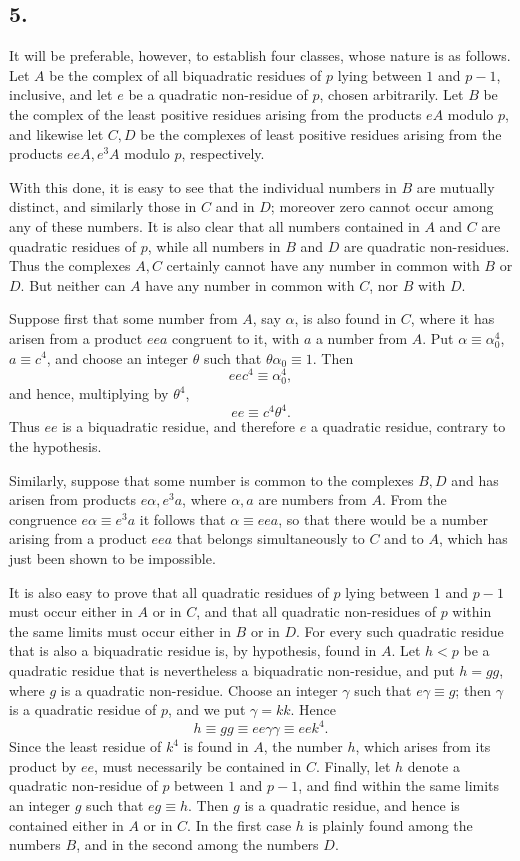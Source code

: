 \documentclass[12pt]{article}
\begin{document}
\subsection*{5.}

It will be preferable, however, to establish four classes, whose nature is as follows. Let $A$ be the complex of all biquadratic residues of $p$ lying between $1$ and $p-1$, inclusive, and let $e$ be a quadratic non-residue of $p$, chosen arbitrarily. Let $B$ be the complex of the least positive residues arising from the products $eA$ modulo $p$, and likewise let $C,D$ be the complexes of least positive residues arising from the products $eeA,e^3A$ modulo $p$, respectively.

With this done, it is easy to see that the individual numbers in $B$ are mutually distinct, and similarly those in $C$ and in $D$; moreover zero cannot occur among any of these numbers. It is also clear that all numbers contained in $A$ and $C$ are quadratic residues of $p$, while all numbers in $B$ and $D$ are quadratic non-residues. Thus the complexes $A,C$ certainly cannot have any number in common with $B$ or $D$. But neither can $A$ have any number in common with $C$, nor $B$ with $D$.

Suppose first that some number from $A$, say $\alpha$, is also found in $C$, where it has arisen from a product $eea$ congruent to it, with $a$ a number from $A$. Put $\alpha\equiv \alpha_0^4$, $a\equiv c^4$, and choose an integer $\theta$ such that $\theta\alpha_0\equiv1$. Then
\[
ee c^4\equiv \alpha_0^4,
\]
and hence, multiplying by $\theta^4$,
\[
ee\equiv c^4\theta^4.
\]
Thus $ee$ is a biquadratic residue, and therefore $e$ a quadratic residue, contrary to the hypothesis.

Similarly, suppose that some number is common to the complexes $B,D$ and has arisen from products $e\alpha,e^3a$, where $\alpha,a$ are numbers from $A$. From the congruence $e\alpha\equiv e^3a$ it follows that $\alpha\equiv eea$, so that there would be a number arising from a product $eea$ that belongs simultaneously to $C$ and to $A$, which has just been shown to be impossible.

It is also easy to prove that all quadratic residues of $p$ lying between $1$ and $p-1$ must occur either in $A$ or in $C$, and that all quadratic non-residues of $p$ within the same limits must occur either in $B$ or in $D$. For every such quadratic residue that is also a biquadratic residue is, by hypothesis, found in $A$. Let $h<p$ be a quadratic residue that is nevertheless a biquadratic non-residue, and put $h=gg$, where $g$ is a quadratic non-residue. Choose an integer $\gamma$ such that $e\gamma\equiv g$; then $\gamma$ is a quadratic residue of $p$, and we put $\gamma=kk$. Hence
\[
h\equiv gg\equiv ee\gamma\gamma\equiv ee k^4.
\]
Since the least residue of $k^4$ is found in $A$, the number $h$, which arises from its product by $ee$, must necessarily be contained in $C$. Finally, let $h$ denote a quadratic non-residue of $p$ between $1$ and $p-1$, and find within the same limits an integer $g$ such that $eg\equiv h$. Then $g$ is a quadratic residue, and hence is contained either in $A$ or in $C$. In the first case $h$ is plainly found among the numbers $B$, and in the second among the numbers $D$.
\end{document}
